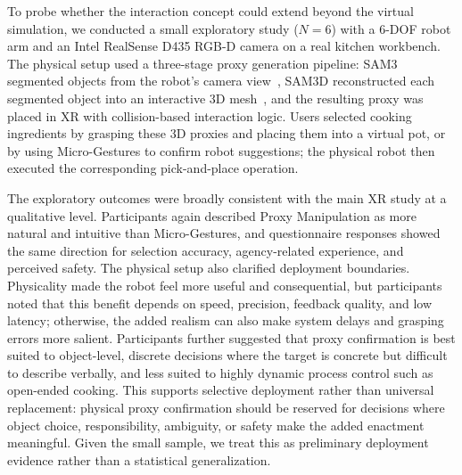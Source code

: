 \documentclass[sigconf,review,anonymous]{acmart}
\begin{document}
To probe whether the interaction concept could extend beyond the virtual simulation, we conducted a small exploratory study ($N=6$) with a 6-DOF robot arm and an Intel RealSense D435 RGB-D camera on a real kitchen workbench. The physical setup used a three-stage proxy generation pipeline: SAM3 segmented objects from the robot's camera view~\cite{carion2025sam3segmentconcepts}, SAM3D reconstructed each segmented object into an interactive 3D mesh~\cite{2025arXiv251116624S}, and the resulting proxy was placed in XR with collision-based interaction logic. Users selected cooking ingredients by grasping these 3D proxies and placing them into a virtual pot, or by using Micro-Gestures to confirm robot suggestions; the physical robot then executed the corresponding pick-and-place operation.

The exploratory outcomes were broadly consistent with the main XR study at a qualitative level. Participants again described Proxy Manipulation as more natural and intuitive than Micro-Gestures, and questionnaire responses showed the same direction for selection accuracy, agency-related experience, and perceived safety. The physical setup also clarified deployment boundaries. Physicality made the robot feel more useful and consequential, but participants noted that this benefit depends on speed, precision, feedback quality, and low latency; otherwise, the added realism can also make system delays and grasping errors more salient. Participants further suggested that proxy confirmation is best suited to object-level, discrete decisions where the target is concrete but difficult to describe verbally, and less suited to highly dynamic process control such as open-ended cooking. This supports selective deployment rather than universal replacement: physical proxy confirmation should be reserved for decisions where object choice, responsibility, ambiguity, or safety make the added enactment meaningful. Given the small sample, we treat this as preliminary deployment evidence rather than a statistical generalization.
\end{document}
